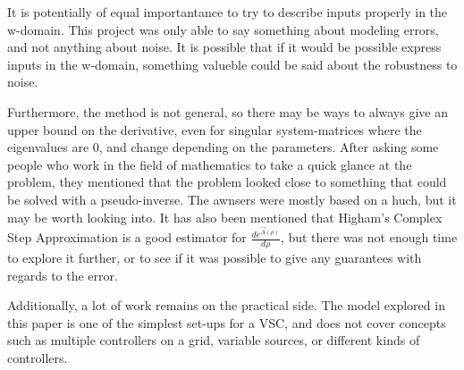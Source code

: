 \noindent
It is potentially of equal importantance to try to describe inputs properly in the w-domain. This project was only able to say something about modeling errors, and not anything about noise. It is possible that if it would be possible express inputs in the w-domain, something valueble could be said about the robustness to noise. 

Furthermore, the method is not general, so there may be ways to always give an upper bound on the derivative, even for singular system-matrices where the eigenvalues are 0, and change depending on the parameters. After asking some people who work in the field of mathematics to take a quick glance at the problem, they mentioned that the problem looked close to something that could be solved with a pseudo-inverse. The awnsers were mostly based on a huch, but it may be worth looking into. It has also been mentioned that Higham's Complex Step Approximation is a good estimator for $\frac{d e^{\Vec{A}(\rho)}}{d \rho }$, but there was not enough time to explore it further, or to see if it was possible to give any guarantees with regards to the error. 

\noindent

Additionally, a lot of work remains on the practical side. The model explored in this paper is one of the simplest set-ups for a \gls{VSC}, and does not cover concepts such as multiple controllers on a grid, variable sources, or different kinds of controllers. 

